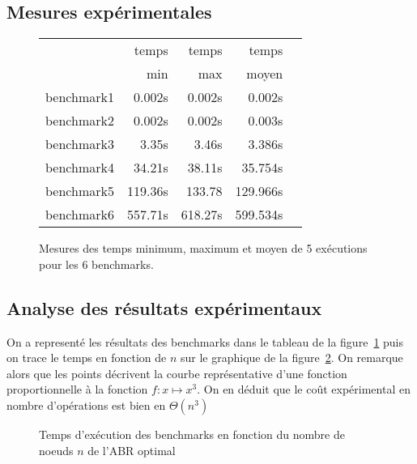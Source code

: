 \documentclass[a4paper,10pt,french]{article}
\begin{document}
\subsection{Mesures expérimentales}

\begin{figure}[h]
    \begin{center}
        \begin{tabular}{|l||r||r|r|r||}
            \hline
            \hline
            & temps     & temps   & temps \\
            & min       & max     & moyen \\
            \hline
            \hline
            benchmark1 &      0.002s &    0.002s &    0.002s     \\
            \hline
            benchmark2 &      0.002s &    0.002s &    0.003s     \\
            \hline
            benchmark3 &     3.35s &    3.46s &    3.386s     \\
            \hline
            benchmark4 &    34.21s &    38.11s &    35.754s     \\
            \hline
            benchmark5 &     119.36s &    133.78 &    129.966s     \\
            \hline
            benchmark6 &     557.71s &    618.27s &    599.534s     \\
            \hline
            \hline
        \end{tabular}
        \caption{Mesures des temps minimum, maximum et moyen de 5 exécutions pour les 6 benchmarks.}
        \label{table-temps}
    \end{center}
\end{figure}

\subsection{Analyse des résultats expérimentaux}
On a representé les résultats des benchmarks dans le tableau de la figure~\ref{table-temps} puis on trace le temps en fonction de $n$ sur le graphique de la figure~\ref{graphe-temps}.
On remarque alors que les points décrivent la courbe représentative d'une fonction proportionnelle à la fonction $f:x\mapsto x^3$. On en déduit que le coût expérimental en nombre d'opérations est bien en $\Theta(n^3)$

\begin{figure}[h]
    \centering{}%
    \caption{Temps d'exécution des benchmarks en fonction du nombre de noeuds $n$ de l'ABR optimal
        \label{graphe-temps}}
\end{figure}
\end{document}
